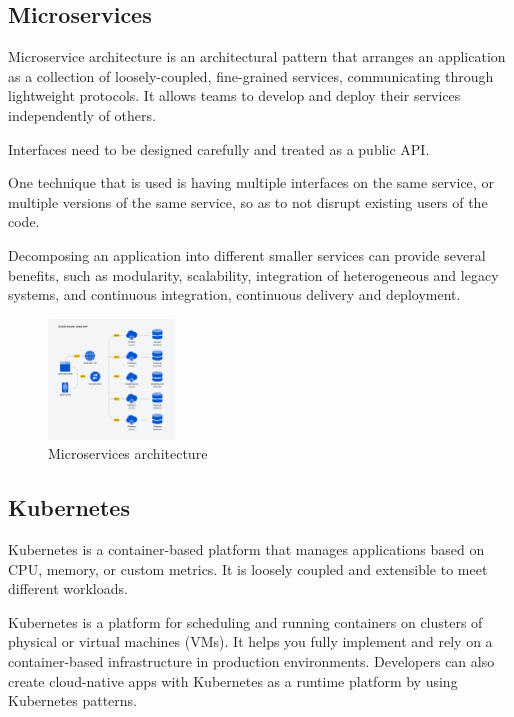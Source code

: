 \documentclass[conference]{IEEEtran}
\begin{document}
\subsection{Microservices}

Microservice architecture is an architectural pattern that arranges an application as a collection of loosely-coupled, fine-grained services, communicating through lightweight protocols. It allows teams to develop and deploy their services independently of others.

Interfaces need to be designed carefully and treated as a public API.

One technique that is used is having multiple interfaces on the same service, or multiple versions of the same service, so as to not disrupt existing users of the code. \cite{b3}

Decomposing an application into different smaller services can provide several benefits, such as modularity, scalability, integration of heterogeneous and legacy systems, and continuous integration, continuous delivery and deployment.

\begin{figure}
    \begin{center}
        \includegraphics[width=0.3\textwidth]{figures/microservice.png}
    \end{center}
    \caption{Microservices architecture}
    \label{fig:2}
\end{figure}


\subsection{Kubernetes}

Kubernetes is a container-based platform that manages applications based on CPU, memory, or custom metrics. It is loosely coupled and extensible to meet different workloads.

Kubernetes is a platform for scheduling and running containers on clusters of physical or virtual machines (VMs). It helps you fully implement and rely on a container-based infrastructure in production environments. Developers can also create cloud-native apps with Kubernetes as a runtime platform by using Kubernetes patterns.
\end{document}
